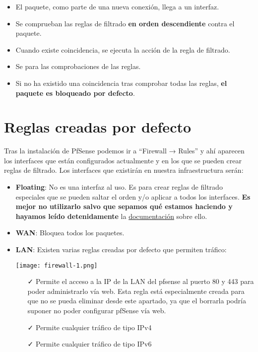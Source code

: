 \begin{itemize}
    \item El paquete, como parte de una nueva conexión, llega a un interfaz.
    \item Se comprueban las reglas de filtrado \textbf{en orden descendiente} contra el paquete.
    \item Cuando existe coincidencia, se ejecuta la acción de la regla de filtrado.
    \item Se para las comprobaciones de las reglas.
    \item Si no ha existido una coincidencia tras comprobar todas las reglas, \textbf{el paquete es bloqueado por defecto}.
\end{itemize}


\section{Reglas creadas por defecto}
Tras la instalación de PfSense podemos ir a “Firewall → Rules” y ahí aparecen los interfaces que están configurados actualmente y en los que se pueden crear reglas de filtrado. Los interfaces que existirán en nuestra infraestructura serán:

\begin{itemize}
    \item \textbf{Floating}: No es una interfaz al uso. Es para crear reglas de filtrado especiales que se pueden saltar el orden y/o aplicar a todos los interfaces. \textbf{Es mejor no utilizarlo salvo que sepamos qué estamos haciendo y hayamos leído detenidamente} la \href{https://docs.netgate.com/pfsense/en/latest/firewall/floating-rules.html}{documentación} sobre ello.
    \item \textbf{WAN}: Bloquea todos los paquetes.
    \item \textbf{LAN}: Existen varias reglas creadas por defecto que permiten tráfico:

    \begin{center}
        \texttt{[image: firewall-1.png]}
    \end{center}

    \begin{enumerate}
        \item[\faCheck] Permite el acceso a la IP de la LAN del pfsense al puerto 80 y 443 para poder administrarlo vía web. Esta regla está especialmente creada para que no se pueda eliminar desde este apartado, ya que el borrarla podría suponer no poder configurar pfSense vía web.
        \item[\faCheck] Permite cualquier tráfico de tipo IPv4
        \item[\faCheck] Permite cualquier tráfico de tipo IPv6
    \end{enumerate}
\end{itemize}

